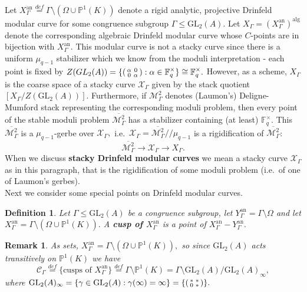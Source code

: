 \documentclass[11pt]{amsart}
\newtheorem{definition}[theorem]{Definition}
\newtheorem{remark}[theorem]{Remark}
\theoremstyle{definition}
\newenvironment{psmallmatrix}
{\left(\begin{smallmatrix}}
	{\end{smallmatrix}\right)}
\numberwithin{equation}{section}
\newcommand{\GL}{\mathrm{GL}} 	%
\newcommand{\cC}{\mathcal{C}}		%
\newcommand{\cM}{\mathcal{M}}		%
\newcommand{\sX}{\mathscr{X}}		%
\newcommand{\bbF}{\mathbb{F}}		%
\newcommand{\bbP}{\mathbb{P}}		%
\begin{document}
		Let $X_{\Gamma}^{\text{an}}\overset{def}{=}\Gamma\setminus(\Omega\cup \bbP^1(K))$ denote a rigid analytic, projective Drinfeld modular curve for some congruence subgroup $\Gamma\leq \GL_2(A).$
		Let $X_{\Gamma}=(X_{\Gamma}^{\text{an}})^{\text{alg}}$ denote the corresponding algebraic Drinfeld modular curve whose $C$-points are in bijection with $X_{\Gamma}^{\text{an}}.$ This modular curve is not a stacky curve since there is a uniform $\mu_{q-1}$ stabilizer which we know from the moduli interpretation - each point is fixed by $\displaystyle{Z(GL_2(A))=\{\begin{psmallmatrix}\alpha&0\\0&\alpha\end{psmallmatrix}:\alpha\in \bbF_q^{\times}\}\cong \bbF_q^{\times}}.$ However, as a scheme, $X_{\Gamma}$ is the coarse space of a stacky curve $\sX_{\Gamma}$ given by the stack quotient $[X_{\Gamma}/Z(\GL_2(A))].$ Furthermore, if $\cM^2_{\Gamma}$ denotes (Laumon's) Deligne-Mumford stack representing the corresponding moduli problem, then every point of the stable moduli problem $\overline{\cM^2_{\Gamma}}$ has a stabilizer containing (at least) $\bbF_q^{\times}.$ This $\overline{\cM^2_{\Gamma}}$ is a $\mu_{q-1}$-gerbe over $\sX_{\Gamma},$ i.e.\ $\displaystyle{\sX_{\Gamma}=\overline{\cM^2_{\Gamma}}/\!/\mu_{q-1}}$ is a rigidification of $\overline{\cM^2_{\Gamma}}$:
		\[\overline{\cM^2_{\Gamma}}\to \sX_{\Gamma}\to X_{\Gamma}.\]
		When we discuss \textbf{stacky Drinfeld modular curves} we mean a stacky curve $\sX_{\Gamma}$ as in this paragraph, that is the rigidification of some moduli problem (i.e.\ of one of Laumon's gerbes).\\ 
		
		Next we consider some special points on Drinfeld modular curves. 
		\begin{definition}
			Let $\Gamma\leq \GL_2(A)$ be a congruence subgroup, let $Y_{\Gamma}^{\text{an}}=\Gamma\setminus \Omega$ and let $X_{\Gamma}^{\text{an}}=\Gamma\setminus(\Omega\cup \bbP^1(K)).$ A \textbf{cusp of $X_{\Gamma}^{\text{an}}$} is a point of $X_{\Gamma}^{\text{an}}-Y_{\Gamma}^{\text{an}}.$ 
		\end{definition}
		
		\begin{remark}
			As sets, $X_{\Gamma}^{\text{an}}=\Gamma\setminus(\Omega\cup \bbP^1(K)),$ so since $\GL_2(A)$ acts transitively on $\bbP^1(K)$ we have
			\[\cC_{\Gamma}\overset{def}{=}\{\text{cusps of }X_{\Gamma}^{\text{an}}\}\overset{def}{=}\Gamma\setminus \bbP^1(K)=\Gamma\setminus \GL_2(A)/\GL_2(A)_{\infty},\]
			where $\displaystyle{\GL_2(A)_{\infty}=\{\gamma\in \GL_2(A):\gamma(\infty)=\infty\}=\left\{\begin{psmallmatrix}*&*\\0&*\end{psmallmatrix}\right\}}.$
		\end{remark}
		
\end{document}
